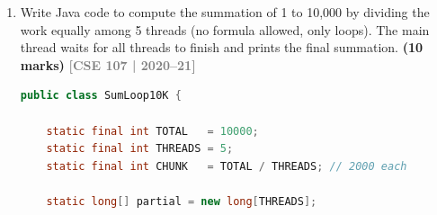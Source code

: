 \documentclass[12pt,a3paper]{article}
\newcommand{\yr}[1]{\hfill\textcolor{gray}{\small\textbf{[#1]}}}
\newcommand{\mk}[1]{\textcolor{orange!70!black}{\small\textbf{(#1 marks)}}}
\begin{document}
\begin{enumerate}
\begin{tcolorbox}
\begin{lstlisting}[language=Java]
    static final int TOTAL   = 10000000;
    static final int THREADS = 10;
    static final int CHUNK   = TOTAL / THREADS; // 1,000,000

    static long[] partial = new long[THREADS];

    static class SumTask implements Runnable {
        private final int id, start, end;
        SumTask(int id, int start, int end) {
            this.id = id; this.start = start; this.end = end;
        }
        @Override
        public void run() {
            long sum = 0;
            for (int i = start; i <= end; i++) // loop only, no formula
                sum += i;
            partial[id] = sum;
        }
    }

    public static void main(String[] args) throws InterruptedException {
        Thread[] threads = new Thread[THREADS];
        for (int i = 0; i < THREADS; i++) {
            int s = i * CHUNK + 1;
            int e = s + CHUNK - 1;
            threads[i] = new Thread(new SumTask(i, s, e));
            threads[i].start();
        }
        for (Thread t : threads) t.join(); // main waits

        long total = 0;
        for (long p : partial) total += p;
        System.out.println("Final sum = " + total);
        // Expected: 50,000,005,000,000
    }
}
\end{lstlisting}

\end{tcolorbox}

\item Write Java code to compute the summation of 1 to 10{,}000 by dividing the work equally among 5 threads (no formula allowed, only loops). The main thread waits for all threads to finish and prints the final summation. \mk{10}
\yr{CSE 107 | 2020--21}

\begin{tcolorbox}[enhanced,breakable,ansbox,
  colback=cF!4,colframe=cF,boxrule=0.8pt,arc=5pt,
  title={\textbf{Answer --- Sum 1 to 10{,}000 (5 Threads, Loops Only)}},
  fonttitle=\bfseries\color{white},colbacktitle=cF]

\begin{lstlisting}[language=Java]
public class SumLoop10K {

    static final int TOTAL   = 10000;
    static final int THREADS = 5;
    static final int CHUNK   = TOTAL / THREADS; // 2000 each

    static long[] partial = new long[THREADS];


\end{lstlisting}
\end{tcolorbox}
\end{enumerate}
\end{document}
